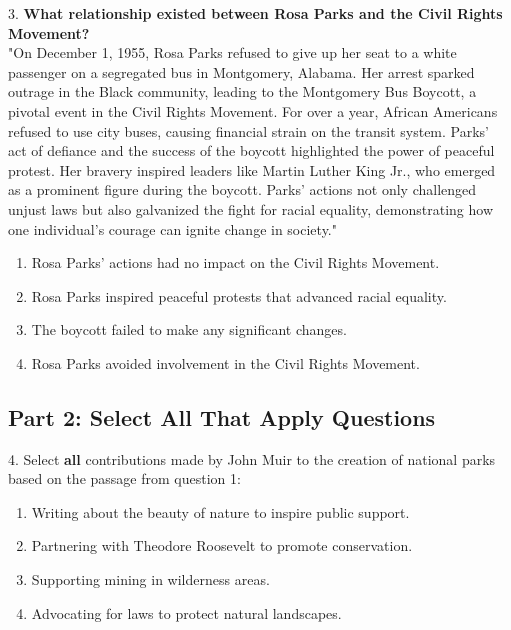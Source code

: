 \documentclass[12pt]{article}
\begin{document}
3. \textbf{What relationship existed between Rosa Parks and the Civil Rights Movement?\\}
"On December 1, 1955, Rosa Parks refused to give up her seat to a white passenger on a segregated bus in Montgomery, Alabama. Her arrest sparked outrage in the Black community, leading to the Montgomery Bus Boycott, a pivotal event in the Civil Rights Movement. For over a year, African Americans refused to use city buses, causing financial strain on the transit system. Parks’ act of defiance and the success of the boycott highlighted the power of peaceful protest. Her bravery inspired leaders like Martin Luther King Jr., who emerged as a prominent figure during the boycott. Parks’ actions not only challenged unjust laws but also galvanized the fight for racial equality, demonstrating how one individual’s courage can ignite change in society."\\
\begin{enumerate}[label=\Alph*.]
    \item Rosa Parks’ actions had no impact on the Civil Rights Movement.  
    \item Rosa Parks inspired peaceful protests that advanced racial equality.  
    \item The boycott failed to make any significant changes.  
    \item Rosa Parks avoided involvement in the Civil Rights Movement.  
\end{enumerate}

\vspace{1cm}

\subsection*{Part 2: Select All That Apply Questions}

4. Select \textbf{all} contributions made by John Muir to the creation of national parks based on the passage from question 1:\\
\begin{enumerate}[label=\Alph*.]
    \item Writing about the beauty of nature to inspire public support.  
    \item Partnering with Theodore Roosevelt to promote conservation.  
    \item Supporting mining in wilderness areas.  
    \item Advocating for laws to protect natural landscapes.  
\end{enumerate}
\end{document}

